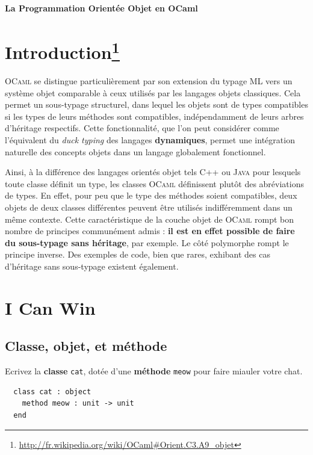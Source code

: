 \documentclass[a4paper]{article}
\begin{document}
\begin{center}
{\Large {\bf La Programmation Orientée Objet en OCaml}}
\end{center}

\bigskip

\section*{Introduction\protect\footnote{\url{http://fr.wikipedia.org/wiki/OCaml\#Orient.C3.A9\_objet}}}

\textsc{OCaml} se distingue particulièrement par son extension du typage
\textsc{ML} vers un système objet comparable à ceux utilisés par les langages
objets classiques.  Cela permet un sous-typage structurel, dans lequel les
objets sont de types compatibles si les types de leurs méthodes sont
compatibles, indépendamment de leurs arbres d'héritage respectifs. Cette
fonctionnalité, que l'on peut considérer comme l'équivalent du \textit{duck
typing} des langages \textbf{dynamiques}, permet une intégration naturelle des
concepts objets dans un langage globalement fonctionnel.

Ainsi, à la différence des langages orientés objet tels \textsc{C++} ou
\textsc{Java} pour lesquels toute classe définit un type, les classes
\textsc{OCaml} définissent plutôt des abréviations de types. En effet, pour peu
que le type des méthodes soient compatibles, deux objets de deux classes
différentes peuvent être utilisés indifféremment dans un même contexte. Cette
caractéristique de la couche objet de \textsc{OCaml} rompt bon nombre de
principes communément admis : \textbf{il est en effet possible de faire du
sous-typage sans héritage}, par exemple. Le côté polymorphe rompt le principe
inverse. Des exemples de code, bien que rares, exhibant des cas d'héritage sans
sous-typage existent
également.

\section{I Can Win}

\subsection{Classe, objet, et méthode}

Ecrivez la \textbf{classe} \verb|cat|, dotée d'une \textbf{méthode} \verb|meow|
pour faire miauler votre chat.

\vspace{3mm}
\begin{verbatim}
  class cat : object
    method meow : unit -> unit
  end
\end{verbatim}
\vspace{3mm}
\end{document}

